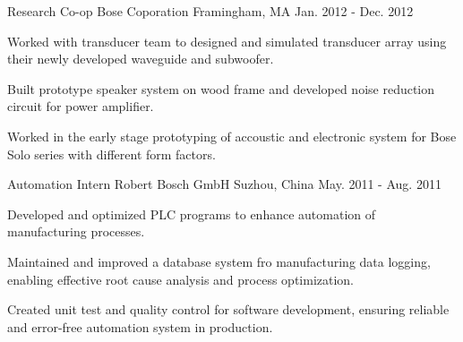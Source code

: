 \begin{cventries}
	\cventry
		{Research Co-op} %
		{Bose Coporation} %
		{Framingham, MA} %
		{Jan. 2012 - Dec. 2012} %
		{
			\begin{cvitems} %
				\item {Worked with transducer team to designed and simulated transducer array using their newly developed waveguide and subwoofer.}
				\item {Built prototype speaker system on wood frame and developed noise reduction circuit for power amplifier.}
				\item {Worked in the early stage prototyping of accoustic and electronic system for Bose Solo series with different form factors.}
			\end{cvitems}
		}

	\cventry
		{Automation Intern} %
		{Robert Bosch GmbH} %
		{Suzhou, China} %
		{May. 2011 - Aug. 2011} %
		{
			\begin{cvitems} %
				\item {Developed and optimized PLC programs to enhance automation of manufacturing processes}.
				\item {Maintained and improved a database system fro manufacturing data logging, enabling effective root cause analysis and process optimization.}
				\item {Created unit test and quality control for software development, ensuring reliable and error-free automation system in production.}
			\end{cvitems}
		}

\end{cventries}
